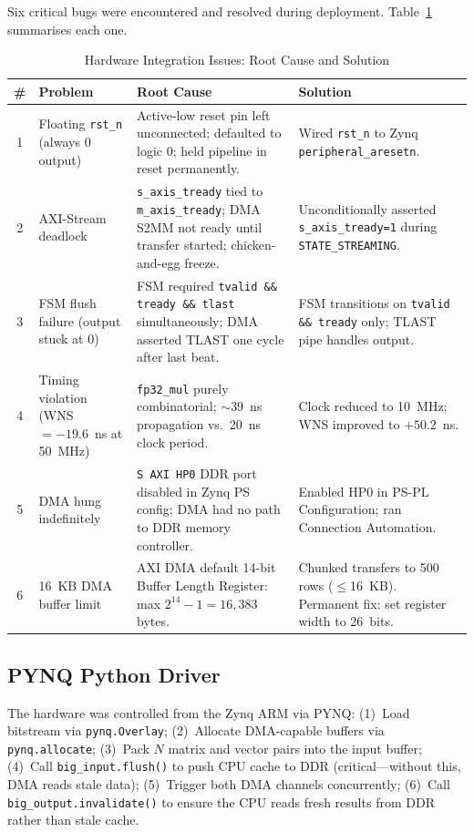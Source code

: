 \documentclass[journal,a4paper]{IEEEtran}
\begin{document}
Six critical bugs were encountered and resolved during deployment.
Table~\ref{tab:bugs} summarises each one.

\begin{table}[!t]
\centering
\caption{Hardware Integration Issues: Root Cause and Solution}
\label{tab:bugs}
\begin{tabular}{clp{5.5cm}p{5.5cm}}
\toprule
\textbf{\#} & \textbf{Problem} & \textbf{Root Cause} & \textbf{Solution} \\
\midrule
1 & Floating \texttt{rst\_n} (always 0 output)
  & Active-low reset pin left unconnected; defaulted to logic 0; held pipeline in reset permanently.
  & Wired \texttt{rst\_n} to Zynq \texttt{peripheral\_aresetn}. \\
\midrule
2 & AXI-Stream deadlock
  & \texttt{s\_axis\_tready} tied to \texttt{m\_axis\_tready}; DMA S2MM not ready until transfer started; chicken-and-egg freeze.
  & Unconditionally asserted \texttt{s\_axis\_tready=1} during \texttt{STATE\_STREAMING}. \\
\midrule
3 & FSM flush failure (output stuck at 0)
  & FSM required \texttt{tvalid \&\& tready \&\& tlast} simultaneously; DMA asserted TLAST one cycle after last beat.
  & FSM transitions on \texttt{tvalid \&\& tready} only; TLAST pipe handles output. \\
\midrule
4 & Timing violation (WNS $= -19.6$~ns at 50~MHz)
  & \texttt{fp32\_mul} purely combinatorial; $\sim$39~ns propagation vs.\ 20~ns clock period.
  & Clock reduced to 10~MHz; WNS improved to $+50.2$~ns. \\
\midrule
5 & DMA hung indefinitely
  & \texttt{S AXI HP0} DDR port disabled in Zynq PS config; DMA had no path to DDR memory controller.
  & Enabled HP0 in PS-PL Configuration; ran Connection Automation. \\
\midrule
6 & 16~KB DMA buffer limit
  & AXI DMA default 14-bit Buffer Length Register: max $2^{14}{-}1=16{,}383$ bytes.
  & Chunked transfers to 500 rows ($\leq$16~KB). Permanent fix: set register width to 26~bits. \\
\bottomrule
\end{tabular}
\end{table}

\subsection{PYNQ Python Driver}

The hardware was controlled from the Zynq ARM via PYNQ:
(1)~Load bitstream via \texttt{pynq.Overlay};
(2)~Allocate DMA-capable buffers via \texttt{pynq.allocate};
(3)~Pack $N$ matrix and vector pairs into the input buffer;
(4)~Call \texttt{big\_input.flush()} to push CPU cache to DDR
(critical---without this, DMA reads stale data);
(5)~Trigger both DMA channels concurrently;
(6)~Call \texttt{big\_output.invalidate()} to ensure the CPU reads
fresh results from DDR rather than stale cache.
\end{document}
